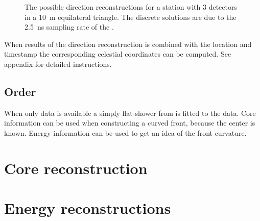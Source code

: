 \begin{figure}
    \centering
    
    \caption{ The possible
             direction reconstructions for a station with 3 detectors in
             a \SI{10}{\meter} equilateral triangle. The discrete
             solutions are due to the \SI{2.5}{\nano\second} sampling
             rate of the \adcs.}
    \label{fig:discrete_directions}
\end{figure}

When results of the direction reconstruction is combined with the \gps
location and timestamp the corresponding celestial coordinates can be
computed. See appendix for detailed instructions.


\subsection{Order}

When only data is available a simply flat-shower from is fitted to the
data. Core information can be used when constructing a curved front,
because the center is known. Energy information can be used to get an
idea of the front curvature.


\section{Core reconstruction}



\section{Energy reconstructions}

